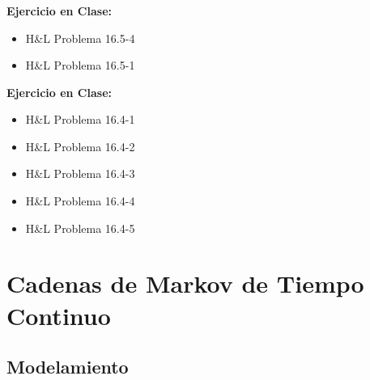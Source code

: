 \documentclass[ 10pt, xcolor = dvipsnames]{beamer}
\begin{document}
\begin{frame}[allowframebreaks]
\frametitle{\insertsubsection}

\textbf{Ejercicio en Clase:}
\begin{itemize}
\item H\&L Problema 16.5-4
\item H\&L Problema 16.5-1
\end{itemize}
\fullskip

\textbf{Ejercicio en Clase:}
\begin{itemize}
\item H\&L Problema 16.4-1
\item H\&L Problema 16.4-2
\item H\&L Problema 16.4-3
\item H\&L Problema 16.4-4
\item H\&L Problema 16.4-5
\end{itemize}

\end{frame}

\section{Cadenas de Markov de Tiempo Continuo}

\subsection{Modelamiento}
\end{document}

